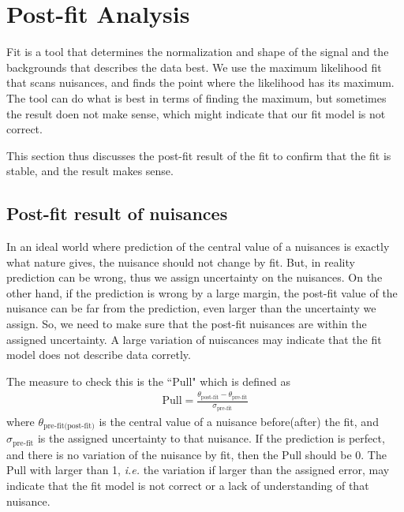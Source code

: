 \section{Post-fit Analysis}

Fit is a tool that determines the normalization and shape of the 
signal and the backgrounds that describes the data best. 
We use the maximum likelihood fit that scans nuisances, and finds 
the point where the likelihood has its maximum. The tool 
can do what is best in terms of finding the maximum, but 
sometimes the result doen not make sense, which might 
indicate that our fit model is not correct. 

This section thus discusses the post-fit result of the fit 
to confirm that the fit is stable, and the result makes sense. 

\subsection{Post-fit result of nuisances}

In an ideal world where prediction of the central value of a nuisances is 
exactly what nature gives, the nuisance should not change by fit. But, in reality 
prediction can be wrong, thus we assign uncertainty on the nuisances. On the other 
hand, if the prediction is wrong by a large margin, the post-fit value of the nuisance 
can be far from the prediction, even larger than the uncertainty we assign. 
So, we need to make sure that the post-fit nuisances are within the assigned uncertainty.
A large variation of nuiscances may indicate that the fit model does not 
describe data corretly. 

The measure to check this is the ``Pull" which is defined as 
\begin{eqnarray} 
\textrm{Pull} = \frac{\theta_{\textrm{post-fit}} - \theta_{\textrm{pre-fit}}}{\sigma_{\textrm{pre-fit}}}  
\end{eqnarray} 
where $\theta_{\textrm{pre-fit(post-fit)}}$ is the central value of a nuisance 
before(after) the fit, and $\sigma_{\textrm{pre-fit}}$ is the assigned uncertainty 
to that nuisance. If the prediction is perfect, and there is no variation of 
the nuisance by fit, then the Pull should be 0. The Pull with larger than 1, 
\textit{i.e.} the variation if larger than the assigned error, may indicate 
that the fit model is not correct or a lack of understanding of that nuisance. 

